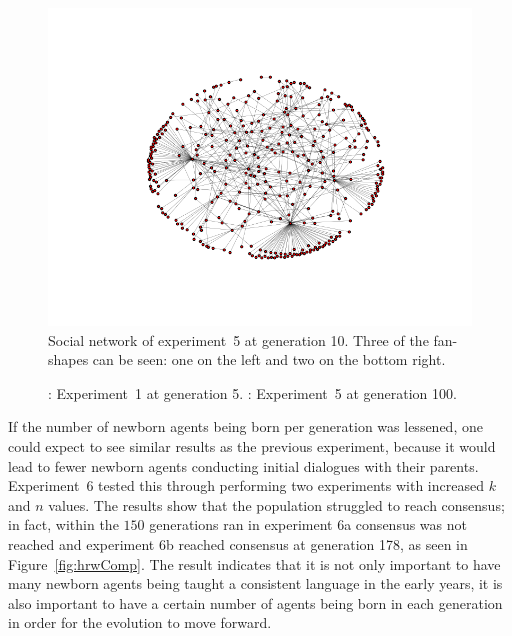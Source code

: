 \begin{figure}
    \centering
    \includegraphics[width=0.49\linewidth]{fig/Results/Exp5/_graph10}
    \caption{Social network of experiment~5 at generation 10. Three of the fan-shapes can be seen: one on the left and two on the bottom right.}
    \label{exp5SN10}
\end{figure}
\begin{figure}
    \centering
    \hfill
    \caption{: Experiment~1 at generation 5. : Experiment~5 at generation 100.}
    \label{fig:SNComparison}
\end{figure}

If the number of newborn agents being born per generation was lessened, one could expect to see similar results as the previous experiment, because it would lead to fewer newborn agents conducting initial dialogues with their parents. Experiment~6 tested this through performing two experiments with increased $k$ and $n$ values. The results show that the population struggled to reach consensus; in fact, within the $150$ generations ran in experiment 6a consensus was not reached and experiment 6b reached consensus at generation 178, as seen in Figure~\ref{fig:hrwComp}. The result indicates that it is not only important to have many newborn agents being taught a consistent language in the early years, it is also important to have a certain number of agents being born in each generation in order for the evolution to move forward. 

